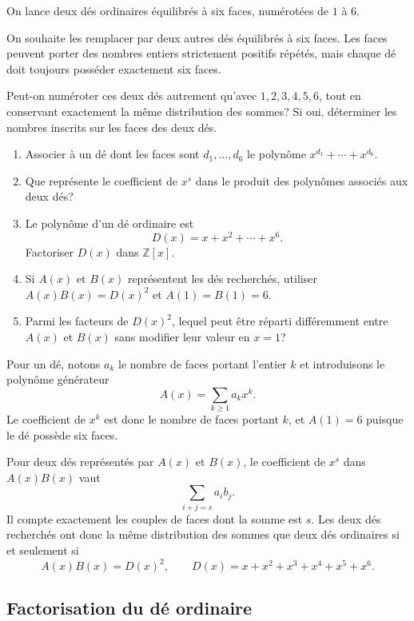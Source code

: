 \documentclass[11pt,a4paper]{article}
\begin{document}

\begin{statementbox}
On lance deux dés ordinaires équilibrés à six faces, numérotées de $1$ à $6$.

On souhaite les remplacer par deux autres dés équilibrés à six faces. Les
faces peuvent porter des nombres entiers strictement positifs répétés, mais
chaque dé doit toujours posséder exactement six faces.

Peut-on numéroter ces deux dés autrement qu'avec
$1,2,3,4,5,6$, tout en conservant exactement la même distribution des sommes?
Si oui, déterminer les nombres inscrits sur les faces des deux dés.
\end{statementbox}

\begin{hintsbox}
\begin{enumerate}
  \item Associer à un dé dont les faces sont $d_1,\ldots,d_6$ le polynôme
  $x^{d_1}+\cdots+x^{d_6}$.
  \item Que représente le coefficient de $x^s$ dans le produit des
  polynômes associés aux deux dés?
  \item Le polynôme d'un dé ordinaire est
  \[
  D(x)=x+x^2+\cdots+x^6.
  \]
  Factoriser $D(x)$ dans $\mathbb Z[x]$.
  \item Si $A(x)$ et $B(x)$ représentent les dés recherchés, utiliser
  $A(x)B(x)=D(x)^2$ et $A(1)=B(1)=6$.
  \item Parmi les facteurs de $D(x)^2$, lequel peut être réparti différemment
  entre $A(x)$ et $B(x)$ sans modifier leur valeur en $x=1$?
\end{enumerate}
\end{hintsbox}

\correction

Pour un dé, notons $a_k$ le nombre de faces portant l'entier $k$ et
introduisons le polynôme générateur
\[
A(x)=\sum_{k\geq1}a_kx^k.
\]
Le coefficient de $x^k$ est donc le nombre de faces portant $k$, et
$A(1)=6$ puisque le dé possède six faces.

Pour deux dés représentés par $A(x)$ et $B(x)$, le coefficient de $x^s$ dans
$A(x)B(x)$ vaut
\[
\sum_{i+j=s}a_i b_j.
\]
Il compte exactement les couples de faces dont la somme est $s$. Les deux dés
recherchés ont donc la même distribution des sommes que deux dés ordinaires
si et seulement si
\[
A(x)B(x)=D(x)^2,
\qquad
D(x)=x+x^2+x^3+x^4+x^5+x^6.
\]

\subsection*{Factorisation du dé ordinaire}
\end{document}
